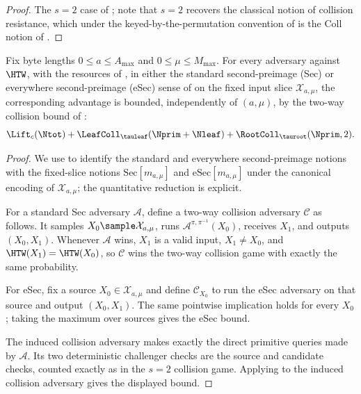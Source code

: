 \begin{proof}
The $s = 2$ case of ; \cite{BH22} note that $s = 2$
recovers the classical notion of collision resistance, which under the
keyed-by-the-permutation convention of  is the
Coll notion of \cite{RS04}.
\end{proof}

\begin{corollary}
\label{cor:second-preimage-rs04}
Fix byte lengths $0 \leq a \leq A_{\max}$ and
$0 \leq \mu \leq M_{\max}$. For every adversary against $\HTW$, with the
resources of , in either the standard
second-preimage (Sec) or everywhere second-preimage (eSec) sense of
\cite{RS04} on the fixed input slice $\mathcal{X}_{a,\mu}$, the
corresponding advantage is bounded, independently of $(a, \mu)$, by the
two-way collision bound of
:
\[
  \Lift_c(\Ntot)
  + \LeafColl_{\tauleaf}(\Nprim+\Nleaf)
  + \RootColl_{\tauroot}(\Nprim, 2).
\]
\end{corollary}

\begin{proof}
We use \cite{RS04} to identify the standard and everywhere second-preimage
notions with the fixed-slice notions
$\mathrm{Sec}[m_{a,\mu}]$ and $\mathrm{eSec}[m_{a,\mu}]$ under the
canonical encoding of $\mathcal{X}_{a,\mu}$; the quantitative reduction
is explicit.

For a standard Sec adversary $\mathcal{A}$, define a two-way collision
adversary $\mathcal{C}$ as follows. It samples
$X_0 \sample \mathcal{X}_{a,\mu}$, runs
$\mathcal{A}^{\pi,\pi^{-1}}(X_0)$, receives $X_1$, and outputs
$(X_0,X_1)$. Whenever $\mathcal{A}$ wins, $X_1$ is a valid input,
$X_1 \neq X_0$, and $\HTW(X_1)=\HTW(X_0)$, so $\mathcal{C}$ wins the
two-way collision game with exactly the same probability.

For eSec, fix a source $X_0 \in \mathcal{X}_{a,\mu}$ and define
$\mathcal{C}_{X_0}$ to run the eSec adversary on that source and output
$(X_0,X_1)$. The same pointwise implication holds for every $X_0$; taking
the maximum over sources gives the eSec bound.

The induced collision adversary makes exactly the direct primitive queries
made by $\mathcal{A}$. Its two deterministic challenger checks are the
source and candidate checks, counted exactly as in the $s=2$ collision
game. Applying  to the induced collision adversary
gives the displayed bound.
\end{proof}

